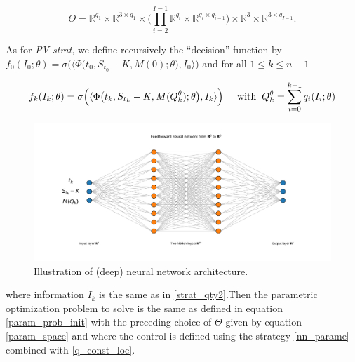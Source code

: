 \documentclass{article}
\newcommand{\q}[1]{``#1''}
\renewcommand{\q}[1]{``#1''}
\numberwithin{equation}{section}
\begin{document}
\begin{equation}
\label{param_space}
\Theta = \mathbb{R}^{q_1} \times \mathbb{R}^{3 \times q_1} \times \Big( \prod_{i = 2}^{I-1}  \mathbb{R}^{q_i} \times \mathbb{R}^{q_i \times q_{i-1}}\Big)  \times \mathbb{R}^3 \times \mathbb{R}^{ 3 \times q_{I-1}}.
\end{equation}


\noindent
As for \textit{PV strat}, we define recursively the \q{decision} function by $f_0(I_0; \theta) = \sigma\Big(\langle \Phi\big(t_0, S_{t_0} - K, M(0); \theta\big) , I_0 \rangle\Big) $ and for all $1 \le k \le n-1$


\begin{equation}
\label{nn_parame}
f_k(I_k; \theta) = \sigma\Big(\langle \Phi\big(t_k, S_{t_k} - K, M(Q_k^\theta); \theta\big) , I_k \rangle\Big) \hspace{0.5cm} \text{with} \hspace{0.2cm} Q_k^\theta = \sum_{i = 0}^{k-1} q_i(I_i; \theta)
\end{equation}

\begin{figure}[!ht]
    \center
    \includegraphics[scale=0.4]{Images/nn_repre.pdf}
    \caption{Illustration of (deep) neural network architecture.}
    \label{nn_representation}
\end{figure}

\noindent
where information $I_k$ is the same as in \eqref{strat_qty2}.Then the parametric optimization problem to solve is the same as defined in equation \eqref{param_prob_init} with the preceding choice of $\Theta$ given by equation \eqref{param_space} and where the control is defined using the strategy \eqref{nn_parame} combined with \eqref{q_const_loc}.
\end{document}
